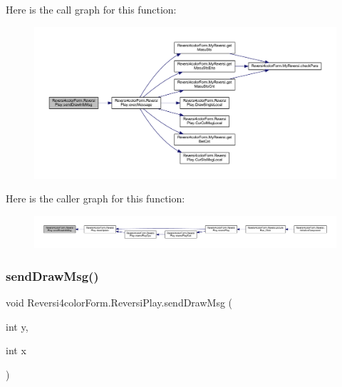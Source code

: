 Here is the call graph for this function\+:
\nopagebreak
\begin{figure}[H]
\begin{center}
\leavevmode
\includegraphics[width=350pt]{class_reversi4color_form_1_1_reversi_play_a99633b55c8a3beff94a2726927fcef09_cgraph}
\end{center}
\end{figure}
Here is the caller graph for this function\+:
\nopagebreak
\begin{figure}[H]
\begin{center}
\leavevmode
\includegraphics[width=350pt]{class_reversi4color_form_1_1_reversi_play_a99633b55c8a3beff94a2726927fcef09_icgraph}
\end{center}
\end{figure}
\mbox{\label{class_reversi4color_form_1_1_reversi_play_ab6f979e1e361e6488e8bba9203b6a5b2}} 
\subsubsection{\texorpdfstring{send\+Draw\+Msg()}{sendDrawMsg()}}
{\footnotesize\ttfamily void Reversi4color\+Form.\+Reversi\+Play.\+send\+Draw\+Msg (\begin{DoxyParamCaption}\item[{int}]{y,  }\item[{int}]{x }\end{DoxyParamCaption})}



